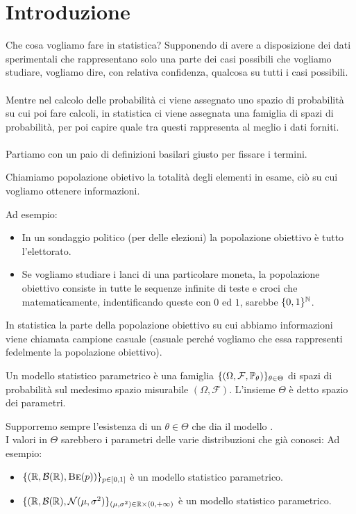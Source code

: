\documentclass[11pt]{book}
\begin{document}
\tableofcontents
\chapter{Introduzione}
Che cosa vogliamo fare in statistica? Supponendo di avere a disposizione dei dati sperimentali che rappresentano solo una parte dei casi possibili che vogliamo studiare, vogliamo dire, con relativa confidenza, qualcosa su tutti i casi possibili.\\
\\
Mentre nel calcolo delle probabilità ci viene assegnato uno spazio di probabilità su cui poi fare calcoli, in statistica ci viene assegnata una famiglia di spazi di probabilità, per poi capire quale tra questi rappresenta al meglio i dati forniti.\\
\\
Partiamo con un paio di definizioni basilari giusto per fissare i termini.

\begin{mydef}
Chiamiamo popolazione obietivo la totalità degli elementi in esame, ciò su cui vogliamo ottenere informazioni.
\end{mydef}
\noindent
Ad esempio:
\begin{itemize}
\item In un sondaggio politico (per delle elezioni) la popolazione obiettivo è tutto l'elettorato.
\item Se vogliamo studiare i lanci di una particolare moneta, la popolazione obiettivo consiste in tutte le sequenze infinite di teste e croci che matematicamente, indentificando queste con $0$ ed $1$, sarebbe $\{0,1\}^\N$.
\end{itemize}
In statistica la parte della popolazione obiettivo su cui abbiamo informazioni viene chiamata campione casuale (casuale perché vogliamo che essa rappresenti fedelmente la popolazione obiettivo).
\begin{mydef}
Un modello statistico parametrico è una famiglia $\{(\Omega,\mathcal{F},\P_\theta)\}_{\theta \in \Theta}$ di spazi di probabilità sul medesimo spazio misurabile $(\Omega,\mathcal{F})$. L'insieme $\Theta$ è detto spazio dei parametri.
\end{mydef}
\noindent
Supporremo sempre l'esistenza di un $\theta \in \Theta$ che dia il modello .\\
I valori in $\Theta$ sarebbero i parametri delle varie distribuzioni che già conosci: Ad esempio:
\begin{itemize}
\item $\{(\R,\mathcal{B}(\R),\Bernoulli(p))\}_{p \in [0,1]}$ è un modello statistico parametrico.
\item $\{(\R,\mathcal{B}(\R), \Normal(\mu,\sigma^2)\}_{(\mu,\sigma^2) \in \R \times (0,+\infty)}$ è un modello statistico parametrico.
\end{itemize}
\end{document}

